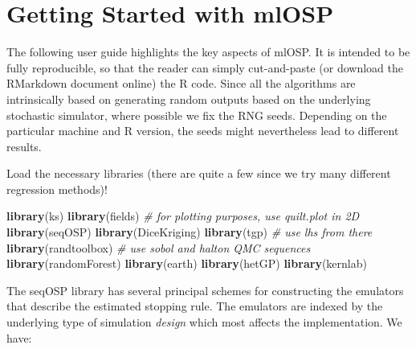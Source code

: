 \documentclass[]{article}
\newenvironment{Shaded}{\begin{snugshade}}{\end{snugshade}}
\newcommand{\KeywordTok}[1]{\textcolor[rgb]{0.13,0.29,0.53}{\textbf{#1}}}
\newcommand{\CommentTok}[1]{\textcolor[rgb]{0.56,0.35,0.01}{\textit{#1}}}
\newcommand{\NormalTok}[1]{#1}
\begin{document}
\section{Getting Started with mlOSP}\label{getting-started-with-mlosp}

The following user guide highlights the key aspects of mlOSP. It is
intended to be fully reproducible, so that the reader can simply
cut-and-paste (or download the RMarkdown document online) the R code.
Since all the algorithms are intrinsically based on generating random
outputs based on the underlying stochastic simulator, where possible we
fix the RNG seeds. Depending on the particular machine and R version,
the seeds might nevertheless lead to different results.

Load the necessary libraries (there are quite a few since we try many
different regression methods)!

\begin{Shaded}
\begin{Highlighting}[]
\KeywordTok{library}\NormalTok{(ks)}
\KeywordTok{library}\NormalTok{(fields) }\CommentTok{# for plotting purposes, use quilt.plot in 2D}
\KeywordTok{library}\NormalTok{(seqOSP)}
\KeywordTok{library}\NormalTok{(DiceKriging)}
\KeywordTok{library}\NormalTok{(tgp)  }\CommentTok{# use lhs from there}
\KeywordTok{library}\NormalTok{(randtoolbox)  }\CommentTok{# use sobol and halton QMC sequences}
\KeywordTok{library}\NormalTok{(randomForest)}
\KeywordTok{library}\NormalTok{(earth)}
\KeywordTok{library}\NormalTok{(hetGP)}
\KeywordTok{library}\NormalTok{(kernlab)}
\end{Highlighting}
\end{Shaded}

The seqOSP library has several principal schemes for constructing the
emulators that describe the estimated stopping rule. The emulators are
indexed by the underlying type of simulation \emph{design} which most
affects the implementation. We have:
\end{document}
